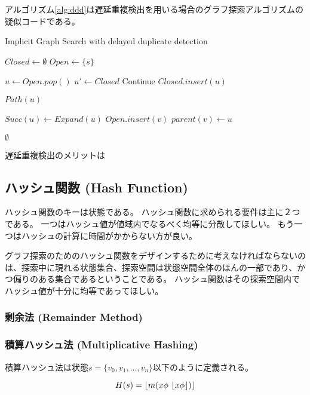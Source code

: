 アルゴリズム\ref{alg:ddd}は遅延重複検出を用いる場合のグラフ探索アルゴリズムの疑似コードである。

\begin{algorithm}
\caption{Implicit Graph Search with delayed duplicate detection}
\label{alg:ddd}
	$Closed \leftarrow \emptyset$\;
	$Open \leftarrow \{s\}$\;
	 {
		$u \leftarrow Open.pop()$\;
		 {
			$u' \leftarrow Closed$
			Continue\;
		}
		$Closed.insert(u)$\;
		
		 {
			\Return $Path(u)$\;
		}
		
		$Succ(u) \leftarrow Expand(u)$\;
		 {
			$Open.insert(v)$\;
			$parent(v) \leftarrow u$\;
		}
 	}
	\Return $\emptyset$\;
\end{algorithm}


遅延重複検出のメリットは


\subsection{ハッシュ関数 (Hash Function)}
\label{sec:hash-function}

ハッシュ関数のキーは状態である。
ハッシュ関数に求められる要件は主に２つである。
一つはハッシュ値が値域内でなるべく均等に分散してほしい。
もう一つはハッシュの計算に時間がかからない方が良い。

グラフ探索のためのハッシュ関数をデザインするために考えなければならないのは、探索中に現れる状態集合、探索空間は状態空間全体のほんの一部であり、かつ偏りのある集合であるということである。
ハッシュ関数はその探索空間内でハッシュ値が十分に均等であってほしい。


\subsubsection{剰余法 (Remainder Method)}

\subsubsection{積算ハッシュ法 (Multiplicative Hashing)}
積算ハッシュ法は状態$s = \{v_0, v_1,...,v_n\}$以下のように定義される。

\begin{equation}
	H(s) = \lfloor m (x \phi \ \lfloor x \phi\rfloor)\rfloor
\end{equation}

